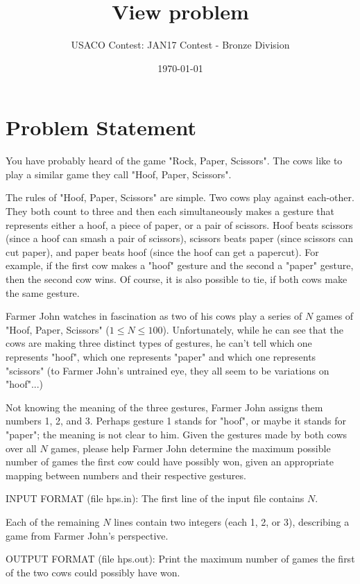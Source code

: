 \documentclass[12pt]{article}
\title{View problem}
\author{USACO Contest: JAN17 Contest - Bronze Division}
\date{\today}
\begin{document}
\maketitle

\section*{Problem Statement}

You have probably heard of the game "Rock, Paper, Scissors".  The cows like to
play a similar game they call "Hoof, Paper, Scissors". 

The rules of "Hoof, Paper, Scissors" are simple.  Two cows play against
each-other.  They both count to three and then each simultaneously makes a
gesture that represents either a hoof, a piece of paper, or a pair of scissors. 
Hoof beats scissors (since a hoof can smash a pair of scissors), scissors beats
paper (since scissors can cut paper), and paper beats hoof (since the hoof can
get a papercut).   For example, if the first cow makes a "hoof" gesture and the
second a "paper" gesture, then the second cow wins.  Of course, it is also
possible to tie, if both cows make the same gesture.

Farmer John watches in fascination as two of his cows play a series of $N$
games of "Hoof, Paper,  Scissors" ($1 \leq N \leq 100$).  Unfortunately, while
he can see that the cows are making three distinct types of gestures, he can't
tell which one represents "hoof", which one represents "paper" and which one
represents "scissors" (to Farmer John's untrained eye, they all seem to be
variations on "hoof"...)

Not knowing the meaning of the three gestures, Farmer John assigns them numbers
1, 2, and 3. Perhaps gesture 1 stands for "hoof", or maybe it stands for
"paper"; the meaning is not clear to him.  Given the gestures made by both cows
over all $N$ games, please help Farmer John determine the maximum possible
number of games the first cow could have possibly won, given an appropriate
mapping between numbers and their respective gestures.

INPUT FORMAT (file hps.in):
The first line of the input file contains $N$. 

Each of the remaining $N$ lines contain two integers (each 1, 2, or 3),
describing a game from Farmer John's perspective.

OUTPUT FORMAT (file hps.out):
Print the maximum number of games the first of the two cows could possibly have
won.
\end{document}
